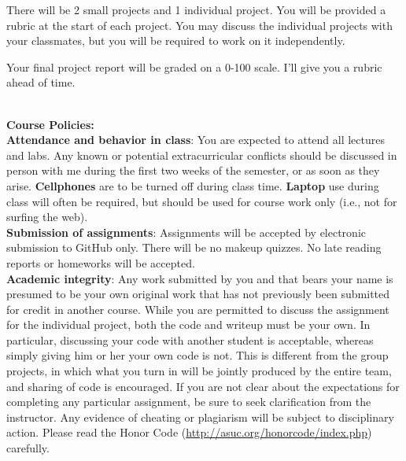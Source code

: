 \documentclass[11pt]{article}
\begin{document}

There will be 2 small projects and 1 individual project. You will be provided a
rubric at the start of each project.  You may discuss the individual projects
with your classmates, but you will be required to work on it independently.

Your final project report will be graded on a 0-100 scale. I'll give you a
rubric ahead of time.


\textbf{\large \\ Course Policies:} \\

\textbf{Attendance and behavior in class}: You are expected to attend all lectures
and labs.  Any known or potential extracurricular conflicts should be discussed
in person with me during the first two weeks of the semester, or as
soon as they arise. \textbf{Cellphones} are to be turned off during class time.
\textbf{Laptop} use during class will often be required, but should be
used for course work only (i.e., not for surfing the web).\\

\textbf{Submission of assignments}: Assignments will be accepted by electronic
submission to GitHub only.  There will be no makeup quizzes. No
late reading reports or homeworks will be accepted. \\ %

\textbf{Academic integrity}:
Any work submitted by you and that bears your name is presumed to be your own
original work that has not previously been submitted for credit in another
course. While you are permitted to discuss the assignment for the individual project,
both the code and writeup must be your own.  In particular, discussing your
code with another student is acceptable, whereas simply giving him or her your
own code is not.  This is different from the group projects, in which what you
turn in will be jointly produced by the entire team, and sharing of code is
encouraged. If you are not clear about the expectations for completing any
particular assignment, be sure to seek clarification from the instructor.  Any
evidence of cheating or plagiarism will be subject to disciplinary action.
Please read the Honor Code (\url{http://asuc.org/honorcode/index.php})
carefully.\\
\end{document}
